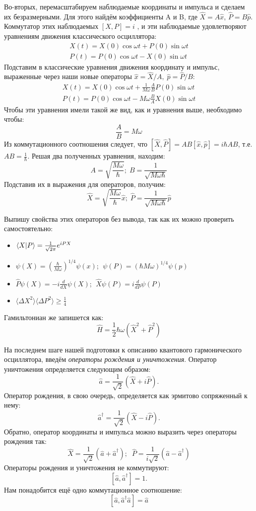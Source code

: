 Во-вторых, перемасштабируем наблюдаемые координаты и импульса и сделаем их безразмерными. Для этого найдём коэффициенты A и B, где $\hat{X} = A\hat{x}$, $\hat{P} = B\hat{p}$. Коммутатор этих наблюдаемых $\left[X, P \right] = i$ , и эти наблюдаемые удовлетворяют уравнениям движения классического осциллятора:
\begin{gather*}
    X(t) = X(0)\cos\omega t + P(0)\sin\omega t \\
    P(t) = P(0)\cos \omega t - X(0) \sin\omega t
\end{gather*}
Подставим в классические уравнения движения координату и импульс, выраженные через наши новые операторы $\hat{x} = \hat{X}/A,\;\hat{p} = \hat{P}/B$:
\begin{gather*}
    X(t) = X(0)\cos \omega t + \frac{1}{M\omega}\frac{A}{B}P(0)\sin\omega t \\
    P(t) = P(0)\cos \omega t - M\omega\frac{B}{A}X(0)\sin\omega t
\end{gather*}
Чтобы эти уравнения имели такой же вид, как и уравнения выше, необходимо чтобы:
\[
\frac{A}{B} = M\omega
\]
Из коммутационного соотношения следует, что $\left[\hat{X}, \hat{P}\right] = AB\left[\hat{x},\hat{p}\right] = i\hbar AB$, т.е. $AB = \frac{1}{\hbar}$. Решая два полученных уравнения, находим:
\[
A = \sqrt{\frac{M\omega}{\hbar}}; \; B = \frac{1}{\sqrt{M\omega \hbar}}
\]
Подставив их в выражения для операторов, получим:
\[
\hat{X} = \sqrt{\frac{M\omega}{\hbar}}\hat{x}; \; \hat{P} = \frac{1}{\sqrt{M\omega \hbar}}\hat{p}
\]

Выпишу свойства этих операторов без вывода, так как их можно проверить самостоятельно:
\begin{itemize}
    \item $\bra{X}\ket{P} = \frac{1}{\sqrt{2\pi}}e^{iPX}$
    \item $\psi(X) = \left(\frac{\hbar}{M\omega}\right)^{1/4}\psi(x)$; $\;\psi(P) = \left(\hbar M\omega \right)^{1/4}\psi(p)$
    \item $\hat{P}\psi(X) = -i\frac{d}{dX}\psi(X)$;   $\;\hat{X}\psi(P) = i\frac{d}{dP}\psi(P)$
    \item $\langle\Delta X^2\rangle\langle\Delta P^2\rangle \geq \frac{1}{4}$
\end{itemize}
Гамильтониан же запишется как:
\[
\hat{H} = \frac{1}{2}\hbar\omega(\hat{X}^2 + \hat{P}^2)
\]

На последнем шаге нашей подготовки к описанию квантового гармонического осциллятора, введём \textit{операторы рождения и уничтожения}. Оператор уничтожения определяется следующим образом:
\[
\hat{a} = \frac{1}{\sqrt{2}}\left(\hat{X} + i\hat{P} \right).
\]
Оператор рождения, в свою очередь, определяется как эрмитово сопряженный к нему:
\[
\hat{a}^{\dagger} = \frac{1}{\sqrt{2}}\left(\hat{X} - i\hat{P} \right).
\]
Обратно, оператор координаты и импульса можно выразить через операторы рождения так:
\[
\hat{X} = \frac{1}{\sqrt{2}}(\hat{a} + \hat{a}^{\dagger}); \;\; \hat{P} = \frac{1}{i\sqrt{2}}(\hat{a} - \hat{a}^{\dagger})
\]
Операторы рождения и уничтожения не коммутируют:
\[
[\hat{a}, \hat{a}^{\dagger}] = 1.
\]
Нам понадобится ещё одно коммутационное соотношение:
\[
[\hat{a}, \hat{a}^{\dagger}\hat{a}] = \hat{a}
\]


